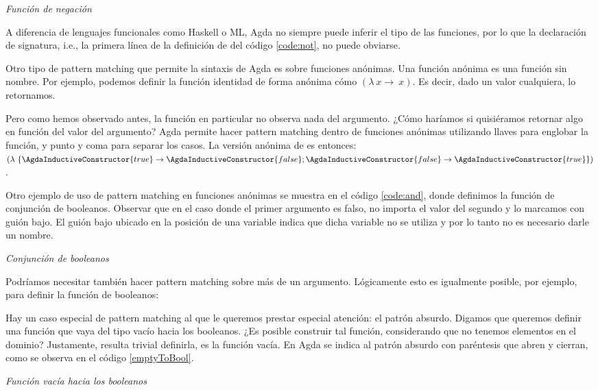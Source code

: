 \begin{agdacode}{\it Función de negación}\label{code:not}
  
\end{agdacode}

A diferencia de lenguajes funcionales como Haskell o ML, Agda no siempre puede inferir el tipo de las funciones, por lo que la declaración de signatura, i.e., la primera línea de la definición de  del código \ref{code:not}, no puede obviarse. 

Otro tipo de pattern matching que permite la sintaxis de Agda es sobre funciones anónimas. Una función anónima es una función sin nombre. Por ejemplo, podemos definir la función identidad de forma anónima cómo $(\lambda\ x \to\ x)$. Es decir, dado un valor cualquiera, lo retornamos.

Pero como hemos observado antes, la función  en particular no observa nada del argumento. ¿Cómo haríamos si quisiéramos retornar algo en función del valor del argumento? Agda permite hacer pattern matching dentro de funciones anónimas utilizando llaves para englobar la función, y punto y coma para separar los casos. La versión anónima de  es entonces: $(\lambda\ \{ \AgdaInductiveConstructor{true} \to \AgdaInductiveConstructor{false} ; \AgdaInductiveConstructor{false} \to \AgdaInductiveConstructor{true} \})$.

Otro ejemplo de uso de pattern matching en funciones anónimas se muestra en el código \ref{code:and}, donde definimos la función  de conjunción de booleanos. Observar que en el caso donde el primer argumento es falso, no importa el valor del segundo y lo marcamos con guión bajo. El guión bajo ubicado en la posición de una variable indica que dicha variable no se utiliza y por lo tanto no es necesario darle un nombre.  

\begin{agdacode}{\it Conjunción de booleanos}\label{code:and}
  
\end{agdacode}
Podríamos necesitar también hacer pattern matching sobre más de un argumento. Lógicamente esto es igualmente posible, por ejemplo, para definir la función  de booleanos:


Hay un caso especial de pattern matching al que le queremos prestar especial atención: el patrón absurdo. Digamos que queremos definir una función que vaya del tipo vacío hacia los booleanos. ¿Es posible construir tal función, considerando que no tenemos elementos en el dominio? Justamente, resulta trivial definirla, es la función vacía. En Agda se indica al patrón absurdo con paréntesis que abren y cierran, como se observa en el código \ref{emptyToBool}.
\begin{agdacode}{\it Función vacía hacia los booleanos}\label{emptyToBool}

\end{agdacode}

